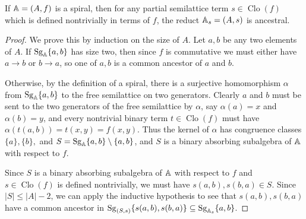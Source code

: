 \documentclass[letterpaper,11pt]{article}
\DeclareMathOperator{\Clo}{Clo}
\DeclareMathOperator{\Sg}{Sg}
\begin{document}
\begin{thm} If $\mathbb{A} = (A,f)$ is a spiral, then for any partial semilattice term $s \in \Clo(f)$ which is defined nontrivially in terms of $f$, the reduct $\mathbb{A}_s = (A,s)$ is ancestral.
\end{thm}
\begin{proof} We prove this by induction on the size of $A$. Let $a,b$ be any two elements of $A$. If $\Sg_\bA\{a,b\}$ has size two, then since $f$ is commutative we must either have $a \rightarrow b$ or $b \rightarrow a$, so one of $a,b$ is a common ancestor of $a$ and $b$.

Otherwise, by the definition of a spiral, there is a surjective homomorphism $\alpha$ from $\Sg_\bA\{a,b\}$ to the free semilattice on two generators. Clearly $a$ and $b$ must be sent to the two generators of the free semilattice by $\alpha$, say $\alpha(a) = x$ and $\alpha(b) = y$, and every nontrivial binary term $t \in \Clo(f)$ must have $\alpha(t(a,b)) = t(x,y) = f(x,y)$. Thus the kernel of $\alpha$ has congruence classes $\{a\}, \{b\},$ and $S = \Sg_\bA\{a,b\}\setminus\{a,b\}$, and $S$ is a binary absorbing subalgebra of $\mathbb{A}$ with respect to $f$.

Since $S$ is a binary absorbing subalgebra of $\mathbb{A}$ with respect to $f$ and $s \in \Clo(f)$ is defined nontrivially, we must have $s(a,b), s(b,a) \in S$. Since $|S| \le |A|-2$, we can apply the inductive hypothesis to see that $s(a,b),s(b,a)$ have a common ancestor in $\Sg_{(S,s)}\{s(a,b),s(b,a)\} \subseteq \Sg_{\bA_s}\{a,b\}$.
\end{proof}
\end{document}
